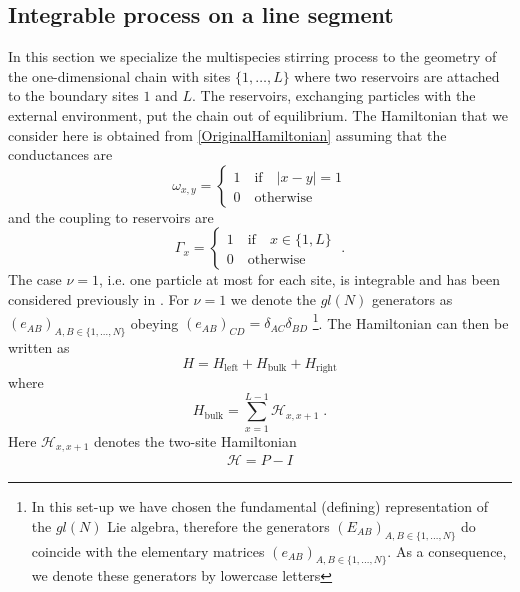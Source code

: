 \documentclass[10pt]{article}
\numberwithin{equation}{section}
\numberwithin{equation}{subsection}
\newcommand{\id}{I}
\newcommand{\dt}{\;.}
\newcommand{\fra}[1]{\textcolor[rgb]{0,0,1}{#1}}
\begin{document}
\subsection{Integrable process on a line segment}\label{subsection-description-process-LINE}
In this section we specialize the multispecies stirring process to the geometry of the one-dimensional chain with sites $\{1,\ldots,L\}$ where two reservoirs are attached to the boundary sites $1$ and $L$.  The reservoirs, exchanging particles with the external environment, put the chain out of equilibrium.  The  Hamiltonian that we consider here is obtained from \eqref{OriginalHamiltonian} assuming that the conductances are
\begin{equation}
	\omega_{x,y}=\begin{cases}
		1 \quad \text{if}\quad |x-y|=1\\
		0\quad \text{otherwise}
	\end{cases}
\end{equation}
and the coupling to reservoirs are
\begin{equation}
	\Gamma_{x}=\begin{cases}
		1\quad \text{if} \quad x\in \{1,L\}\\
		0\quad \text{otherwise}
	\end{cases}\dt
\end{equation}
The case $\nu=1$, i.e. one particle at most for each site, is integrable and has been considered previously in \cite{vanicat2017exact}. 
For  $\nu=1$ we denote the ${gl}(N)$  generators   as  $(e_{AB})_{A,B\in\{1,\ldots,N\}}$ obeying $(e_{AB})_{CD}=\delta_{AC}\delta_{BD}$ \footnote{\fra{In this set-up we have chosen the fundamental (defining) representation of the $gl(N)$ Lie algebra, therefore the generators $(E_{AB})_{A,B\in\{1,\ldots,N\}}$ do coincide with the elementary matrices $(e_{AB})_{A,B\in\{1,\ldots,N\}}$. As a consequence, we denote these generators by lowercase letters}}.
The Hamiltonian can then be written as
\begin{equation}\label{hamiltonian}
	H=H_{\text{left}}+H_{\text{bulk}}+H_{\text{right}}
\end{equation}
where
\begin{equation}
	H_{\text{bulk}}=\sum_{x=1}^{L-1}\mathcal{H}_{x,x+1}\dt
\end{equation}
Here $\mathcal{H}_{x,x+1}$  denotes  the two-site Hamiltonian 
\begin{equation}\label{H-corsivo}
	\begin{split}
		\mathcal{H}=P-\id
	\end{split}
\end{equation}
\end{document}
